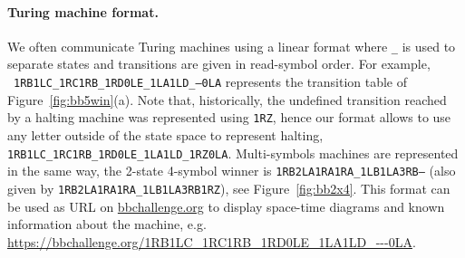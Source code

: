 

\paragraph*{Turing machine format.} We often communicate Turing machines using a linear format where \texttt{\_} is used to separate states and transitions are given in read-symbol order. For example, \\ \texttt{1RB1LC\_1RC1RB\_1RD0LE\_1LA1LD\_---0LA} represents the transition table of Figure~\ref{fig:bb5win}(a). Note that, historically, the undefined transition reached by a halting machine was represented using \texttt{1RZ}, hence our format allows to use any letter outside of the state space to represent halting, \eg \texttt{1RB1LC\_1RC1RB\_1RD0LE\_1LA1LD\_1RZ0LA}. Multi-symbols machines are represented in the same way, \eg the 2-state 4-symbol \BBfull winner is \texttt{1RB2LA1RA1RA\_1LB1LA3RB---} (also given by \texttt{1RB2LA1RA1RA\_1LB1LA3RB1RZ}), see Figure~\ref{fig:bb2x4}. This format can be used as URL on \url{bbchallenge.org} to display space-time diagrams and known information about the machine, e.g. \url{https://bbchallenge.org/1RB1LC\_1RC1RB\_1RD0LE\_1LA1LD\_---0LA}.

